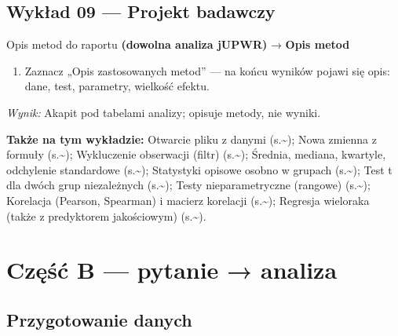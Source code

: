 \documentclass[
  polish,
  10pt,
  a4paper,
  DIV=11,
  numbers=noendperiod]{scrartcl}
\newcommand{\jmenu}[1]{{\color{upwraccent}\small #1}}
\begin{document}

\subsection{Wykład 09 --- Projekt
badawczy}\label{wykux142ad-09-projekt-badawczy}

\begin{jbox}{Opis metod do raportu}\label{w:opis-metod}
\jmenu{\textbf{(dowolna analiza jUPWR)} → \textbf{Opis metod}}

\begin{enumerate}
\item Zaznacz „Opis zastosowanych metod” — na końcu wyników pojawi się opis: dane, test, parametry, wielkość efektu.
\end{enumerate}
\textit{Wynik:} Akapit pod tabelami analizy; opisuje metody, nie wyniki.

\end{jbox}

\textbf{Także na tym wykładzie:} Otwarcie pliku z danymi
(s.\textasciitilde{}\pageref{w:otworz-plik}); Nowa zmienna z formuły
(s.\textasciitilde{}\pageref{w:oblicz-zmienna}); Wykluczenie obserwacji
(filtr) (s.\textasciitilde{}\pageref{w:filtry}); Średnia, mediana,
kwartyle, odchylenie standardowe
(s.\textasciitilde{}\pageref{w:statystyki-opisowe}); Statystyki opisowe
osobno w grupach (s.\textasciitilde{}\pageref{w:porownanie-grup-opis});
Test t dla dwóch grup niezależnych
(s.\textasciitilde{}\pageref{w:t-dwie-grupy}); Testy nieparametryczne
(rangowe) (s.\textasciitilde{}\pageref{w:nieparametryczne}); Korelacja
(Pearson, Spearman) i macierz korelacji
(s.\textasciitilde{}\pageref{w:korelacja}); Regresja wieloraka (także z
predyktorem jakościowym)
(s.\textasciitilde{}\pageref{w:regresja-wieloraka}).

\newpage

\section{Część B --- pytanie →
analiza}\label{czux119ux15bux107-b-pytanie-analiza}


\subsection{Przygotowanie danych}\label{przygotowanie-danych}
\end{document}
